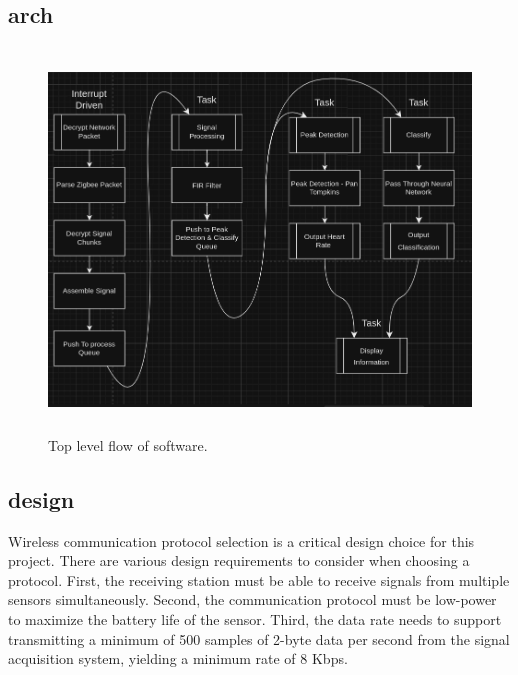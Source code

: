 \documentclass{article}
\begin{document}
\newpage
\subsection{\gls{arch}}

\begin{figure}[h]
    \centering
    \includegraphics[width=5in, height=4in]{flow1.png}
    \caption{Top level flow of software.}
\end{figure}


\newpage
\subsection{\gls{design}}
Wireless communication protocol selection is a critical design choice for this project. There are various design requirements to consider when choosing a protocol. First, the receiving station must be able to receive signals from multiple sensors simultaneously. Second, the communication protocol must be low-power to maximize the battery life of the sensor. Third, the data rate needs to support transmitting a minimum of 500 samples of 2-byte data per second from the signal acquisition system, yielding a minimum rate of 8 Kbps. 
\end{document}

